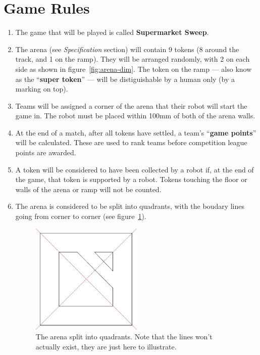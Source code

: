 \section {Game Rules}
\label{game-rules}

\begin{enumerate}
\item The game that will be played is called \textbf{Supermarket Sweep}.
\item The arena (see \emph{Specification} section) will contain 9 tokens (8 around the track, and 1 on the ramp).  They will be arranged randomly, with 2 on each side as shown in figure~\ref{fig:arena-dim}.  The token on the ramp --- also know as the ``\textbf{super token}'' --- will be distiguishable by a human only (by a marking on top).
\item Teams will be assigned a corner of the arena that their robot will start the game in.  The robot must be placed within 100mm of both of the arena walls.
\item At the end of a match, after all tokens have settled, a team's ``\textbf{game points}'' will be calculated.
 These are used to rank teams before competition league points are awarded.
\item A token will be considered to have been collected by a robot if, at the end of the game, that token is supported by a robot.  Tokens touching the floor or walls of the arena or ramp will not be counted.

\item The arena is considered to be split into quadrants, with the boudary lines going from corner to corner (see figure~\ref{fig:quadrants}).

\begin{figure}
\begin{center}
  \includegraphics[keepaspectratio, clip, width=0.5\textwidth]{./images/quadrants.pdf}
  \caption{\label{fig:quadrants}The arena split into quadrants. Note that the lines won't actually exist, they are just here to illustrate.}
\end{center}
\end{figure}


\end{enumerate}

